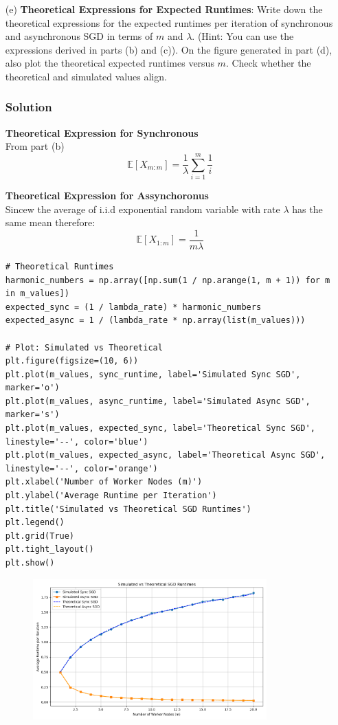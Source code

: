 \documentclass{article}
\begin{document}
\begin{enumerate}
    \item[(e)] \textbf{Theoretical Expressions for Expected Runtimes}:
    Write down the theoretical expressions for the expected runtimes per iteration of synchronous and asynchronous SGD in terms of $m$ and $\lambda$. (Hint: You can use the expressions derived in parts (b) and (c)). On the figure generated in part (d), also plot the theoretical expected runtimes versus $m$. Check whether the theoretical and simulated values align.

    \subsubsection*{Solution}
    \textbf{Theoretical Expression for Synchronous}\\
    From part (b)
    \[\mathbb{E}[X_{m:m}] = \frac{1}{\lambda} \sum_{i=1}^{m} \frac{1}{i}\]

    \textbf{Theoretical Expression for Assynchoronus}\\
    Sincew the average of i.i.d exponential random variable with rate \(\lambda\) has the same mean therefore:
    \[\mathbb{E}[X_{1:m}] = \frac{1}{m \lambda}\]

    \begin{verbatim}
# Theoretical Runtimes
harmonic_numbers = np.array([np.sum(1 / np.arange(1, m + 1)) for m in m_values])
expected_sync = (1 / lambda_rate) * harmonic_numbers
expected_async = 1 / (lambda_rate * np.array(list(m_values)))

# Plot: Simulated vs Theoretical
plt.figure(figsize=(10, 6))
plt.plot(m_values, sync_runtime, label='Simulated Sync SGD', marker='o')
plt.plot(m_values, async_runtime, label='Simulated Async SGD', marker='s')
plt.plot(m_values, expected_sync, label='Theoretical Sync SGD', linestyle='--', color='blue')
plt.plot(m_values, expected_async, label='Theoretical Async SGD', linestyle='--', color='orange')
plt.xlabel('Number of Worker Nodes (m)')
plt.ylabel('Average Runtime per Iteration')
plt.title('Simulated vs Theoretical SGD Runtimes')
plt.legend()
plt.grid(True)
plt.tight_layout()
plt.show()
    \end{verbatim}

    \begin{figure}[H]
        \centering
        \includegraphics[width=0.85\textwidth]{SGD_simulation_theory.png}
        \label{fig:sgd_simulation_theory}
    \end{figure}


\end{enumerate}
\end{document}
